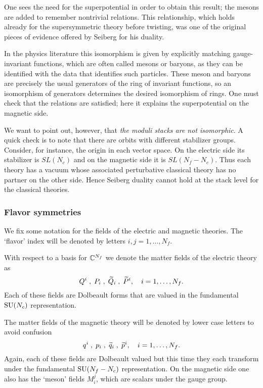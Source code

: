 \documentclass[11pt]{amsart}
\def\SU{{\rm SU}}
\begin{document}
One sees the need for the superpotential in order to obtain this result;
the mesons are added to remember nontrivial relations.
This relationship, which holds already for the supersymmetric theory before twisting, was one of the original pieces of evidence offered by Seiberg for his duality.

\begin{rmk}
In the physics literature this isomorphism is given by explicitly matching gauge-invariant functions, which are often called mesons or baryons, as they can be identified with the data that identifies such particles.
These meson and baryons are precisely the usual generators of the ring of invariant functions, 
so an isomorphism of generators determines the desired isomorphism of rings. 
One must check that the relations are satisfied;
here it explains the superpotential on the magnetic side.
\end{rmk}

We want to point out, however, that {\em the moduli stacks are not isomorphic}.
A quick check is to note that there are orbits with different stabilizer groups.
Consider, for instance, the origin in each vector space.
On the electric side its stabilizer is $SL(N_c)$ and on the magnetic side it is $SL(N_f - N_c)$.
Thus each theory has a vacuum whose associated perturbative classical theory has no partner on the other side.
Hence Seiberg duality cannot hold at the stack level for the classical theories.

\subsubsection{Flavor symmetries}

We fix some notation for the fields of the electric and magnetic theories. 
The `flavor' index will be denoted by letters $i,j=1,\ldots, N_f$. 

With respect to a basis for $\CC^{N_f}$ we denote the matter fields of the electric theory as
\[
Q^i\; , \; P_i \; , \; \Tilde{Q}_i \; , \; \Tilde{P}^i , \quad i = 1, \ldots, N_f.
\]
Each of these fields are Dolbeault forms that are valued in the fundamental $\SU(N_c)$ representation. 

The matter fields of the magnetic theory will be denoted by lower case letters to avoid confusion
\[
q^i\; , \; p_i \; , \; \Tilde{q}_i \; , \; \Tilde{p}^i , \quad i = 1, \ldots, N_f.
\]
Again, each of these fields are Dolbeault valued but this time they each transform under the fundamental $\SU(N_f-N_c)$ representation. 
On the magnetic side one also has the `meson' fields $M_{i}^j$, which are scalars under the gauge group.
\end{document}
